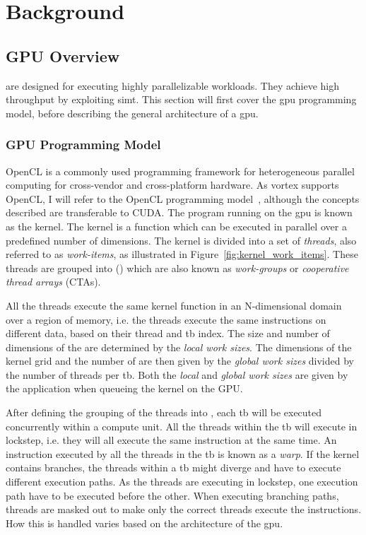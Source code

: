 \chapter{Background}

\section{GPU Overview}

 are designed for executing highly parallelizable workloads. They achieve high throughput by exploiting \acrshort{simt}. This section will first cover the \acrshort{gpu} programming model, before describing the general architecture of a \acrshort{gpu}. 

\subsection{GPU Programming Model}


OpenCL is a commonly used programming framework for heterogeneous parallel computing for cross-vendor and cross-platform hardware. As \Gls{vortex} supports OpenCL, I will refer to the OpenCL programming model~\cite{opencl_introduction}, although the concepts described are transferable to CUDA. The program running on the \acrshort{gpu} is known as the kernel. The kernel is a function which can be executed in parallel over a predefined number of dimensions. The kernel is divided into a set of \textit{threads}, also referred to as \textit{work-items}, as illustrated in Figure~\ref{fig:kernel_work_items}. These threads are grouped into \textit{} () which are also known as \textit{work-groups} or \textit{cooperative thread arrays} (CTAs).

All the threads execute the same kernel function in an N-dimensional domain over a region of memory, i.e. the threads execute the same instructions on different data, based on their thread and \acrshort{tb} index. The size and number of dimensions of the  are determined by the \textit{local work sizes}. The dimensions of the kernel grid and the number of  are then given by the \textit{global work sizes} divided by the number of threads per \acrshort{tb}. Both the \textit{local} and \textit{global work sizes} are given by the application when queueing the kernel on the GPU.

After defining the grouping of the threads into , each \acrshort{tb} will be executed concurrently within a compute unit. All the threads within the \acrshort{tb} will execute in lockstep, i.e. they will all execute the same instruction at the same time. An instruction executed by all the threads in the \acrshort{tb} is known as a \textit{warp}. If the kernel contains branches, the threads within a \acrshort{tb} might diverge and have to execute different execution paths. As the threads are executing in lockstep, one execution path have to be executed before the other. When executing branching paths, threads are masked out to make only the correct threads execute the instructions. How this is handled varies based on the architecture of the \acrshort{gpu}.

